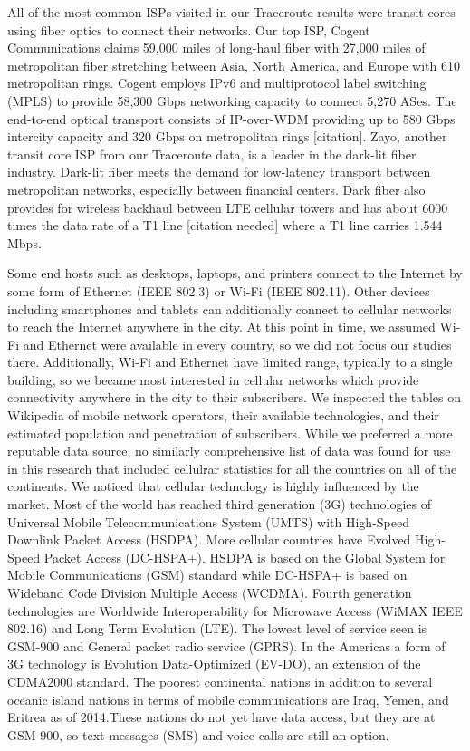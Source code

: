 \documentclass{sigcomm-alternate}
\begin{document}
All of the most common ISPs visited in our Traceroute results were transit cores using fiber optics to connect their networks. Our top ISP, Cogent Communications claims 59,000 miles of long-haul fiber with 27,000 miles of metropolitan fiber stretching between Asia, North America, and Europe with 610 metropolitan rings. Cogent employs IPv6 and multiprotocol label switching (MPLS) to provide 58,300 Gbps networking capacity to connect 5,270 ASes.  The end-to-end optical transport consists of IP-over-WDM providing up to 580 Gbps intercity capacity and 320 Gbps on metropolitan rings [citation]. Zayo, another transit core ISP from our Traceroute data, is a leader in the dark-lit fiber industry. Dark-lit fiber meets the demand for low-latency transport between metropolitan networks, especially between financial centers. Dark fiber also provides for wireless backhaul between LTE cellular towers and has about 6000 times the data rate of a T1 line [citation needed] where a T1 line carries 1.544 Mbps. 

Some end hosts such as desktops, laptops, and printers connect to the Internet by some form of Ethernet (IEEE 802.3) or Wi-Fi (IEEE 802.11). Other devices including smartphones and tablets can additionally connect to cellular networks to reach the Internet anywhere in the city. At this point in time, we assumed Wi-Fi and Ethernet were available in every country, so we did not focus our studies there. Additionally, Wi-Fi and Ethernet have limited range, typically to a single building, so we became most interested in cellular networks which provide connectivity anywhere in the city to their subscribers. We inspected the tables on Wikipedia of mobile network operators,  their available technologies, and their estimated population and penetration of subscribers. While we preferred a more reputable data source, no similarly comprehensive list of data was found for use in this research that included cellulrar statistics for all the countries on all of the continents. We noticed that cellular technology is highly influenced by the market. Most of the world has reached third generation (3G) technologies of Universal Mobile Telecommunications System (UMTS) with High-Speed Downlink Packet Access (HSDPA). More cellular countries have Evolved High-Speed Packet Access (DC-HSPA+).  HSDPA is based on the Global System for Mobile Communications (GSM) standard while DC-HSPA+ is based on Wideband Code Division Multiple Access (WCDMA). Fourth generation technologies are Worldwide Interoperability for Microwave Access (WiMAX IEEE 802.16) and Long Term Evolution (LTE). The lowest level of service seen is GSM-900 and General packet radio service (GPRS). In the Americas a form of 3G technology is Evolution Data-Optimized (EV-DO), an extension of the CDMA2000 standard.
The poorest continental nations in addition to several oceanic island nations in terms of mobile communications are Iraq, Yemen, and Eritrea as of 2014.These nations do not yet have data access, but they are at GSM-900, so text messages (SMS) and voice calls are still an option.  
\end{document}
